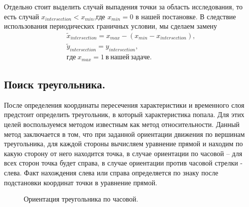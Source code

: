 \documentclass[14pt]{article}
\begin{document}
Отдельно стоит выделить случай выпадения точки за область исследования, то есть случай $x_{intersection}<x_{min}$,где $x_{min}=0$ в нашей постановке.  В следствие использования периодических граничных условии, мы сделаем замену 
\begin{equation}
\begin{aligned}
&\widetilde{x}_{intersection}=x_{max}-(x_{min}-x_{intersection} ),\\
&\widetilde{y}_{intersection}=y_{intersection},\\
&где\: x_{max}=1\: в\: нашей\: задаче. 
\end{aligned}
\end{equation}
\subsection{Поиск треугольника.}
После определения координаты пересечения характеристики и временного слоя предстоит определить треугольник, в который характеристика попала. Для этих целей воспользуемся методом известным как метод относительности. Данный метод заключается в том, что при заданной ориентации движения по вершинам треугольника, для каждой стороны вычисляем уравнение прямой и находим по какую сторону от него находится точка, в случае ориентации по часовой – для всех сторон точка будет справа, в случае ориентации против часовой стрелки - слева. Факт нахождения слева или справа определяется по знаку после подстановки координат точки в уравнение прямой. 
\begin{figure}[!h!]
\caption{Ориентация треугольника по часовой.}
\end{figure}
\end{document}
